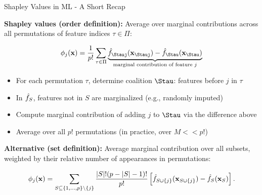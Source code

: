 \documentclass[10pt,compress,t,notes=noshow, xcolor=table]{beamer}
\begin{document}
\begin{frame}{Shapley Values in ML - A Short Recap}

% 
% 
\textbf{Shapley values (order definition):} Average over marginal contributions across all permutations of feature indices $\tau \in \Pi$:

\[
\phi_j(\xv) = \frac{1}{p!} \sum_{\tau \in \Pi} 
\underbrace{\fh_{\Stauj}(\xv_{\Stauj}) - \fh_{\Stau}(\xv_{\Stau})}_{\text{marginal contribution of feature $j$}}
\]

\begin{itemize}
  \item For each permutation $\tau$, determine coalition $\Stau$: features before $j$ in $\tau$
  \item In \(\hat{f}_S\), features not in \(S\) are marginalized (e.g., randomly imputed)
  \item Compute marginal contribution of adding $j$ to $\Stau$ via the difference above
  \item Average over all $p!$ permutations (in practice, over $M << p!$)
\end{itemize}

\pause\medskip

\textbf{Alternative (set definition):} Average marginal contribution over all subsets, weighted by their relative number of appearances in permutations:

\[
\phi_j(\mathbf{x}) = 
\sum_{S \subseteq \{1,\dots,p\} \setminus \{j\}} \frac{|S|!(p - |S| - 1)!}{p!} \left[\hat{f}_{S \cup \{j\}}(\mathbf{x}_{S \cup \{j\}}) - \hat{f}_S(\mathbf{x}_S)\right].
\]
% 
% 

\end{frame}
\end{document}
